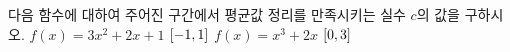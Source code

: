 다음 함수에 대하여 주어진 구간에서 평균값 정리를 만족시키는 실수 $c$의 값을 구하시오.
 $f(x)=3x^2+2x+1$ \quad $[-1{,}\mkern3mu\mathopen{}1]$
 $f(x)=x^3+2x$ \quad $[0{,}\mkern3mu\mathopen{}3]$
